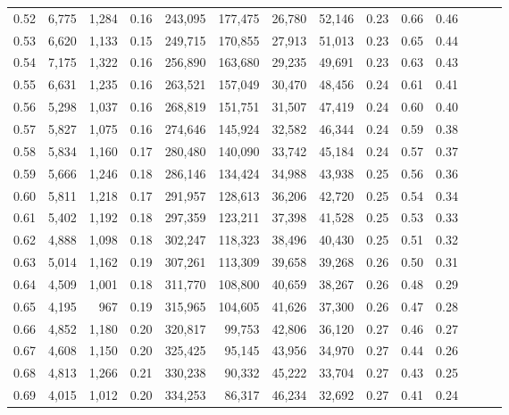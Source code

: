 \begin{tabular}{rrrrrrrrrrrrrr}
0.52 &   6,775 &  1,284 &  0.16 &  243,095 &  177,475 &  26,780 &  52,146 &  0.23 &  0.66 &      0.46 \\
0.53 &   6,620 &  1,133 &  0.15 &  249,715 &  170,855 &  27,913 &  51,013 &  0.23 &  0.65 &      0.44 \\
0.54 &   7,175 &  1,322 &  0.16 &  256,890 &  163,680 &  29,235 &  49,691 &  0.23 &  0.63 &      0.43 \\
0.55 &   6,631 &  1,235 &  0.16 &  263,521 &  157,049 &  30,470 &  48,456 &  0.24 &  0.61 &      0.41 \\
0.56 &   5,298 &  1,037 &  0.16 &  268,819 &  151,751 &  31,507 &  47,419 &  0.24 &  0.60 &      0.40 \\
0.57 &   5,827 &  1,075 &  0.16 &  274,646 &  145,924 &  32,582 &  46,344 &  0.24 &  0.59 &      0.38 \\
0.58 &   5,834 &  1,160 &  0.17 &  280,480 &  140,090 &  33,742 &  45,184 &  0.24 &  0.57 &      0.37 \\
0.59 &   5,666 &  1,246 &  0.18 &  286,146 &  134,424 &  34,988 &  43,938 &  0.25 &  0.56 &      0.36 \\
0.60 &   5,811 &  1,218 &  0.17 &  291,957 &  128,613 &  36,206 &  42,720 &  0.25 &  0.54 &      0.34 \\
0.61 &   5,402 &  1,192 &  0.18 &  297,359 &  123,211 &  37,398 &  41,528 &  0.25 &  0.53 &      0.33 \\
0.62 &   4,888 &  1,098 &  0.18 &  302,247 &  118,323 &  38,496 &  40,430 &  0.25 &  0.51 &      0.32 \\
0.63 &   5,014 &  1,162 &  0.19 &  307,261 &  113,309 &  39,658 &  39,268 &  0.26 &  0.50 &      0.31 \\
0.64 &   4,509 &  1,001 &  0.18 &  311,770 &  108,800 &  40,659 &  38,267 &  0.26 &  0.48 &      0.29 \\
0.65 &   4,195 &    967 &  0.19 &  315,965 &  104,605 &  41,626 &  37,300 &  0.26 &  0.47 &      0.28 \\
0.66 &   4,852 &  1,180 &  0.20 &  320,817 &   99,753 &  42,806 &  36,120 &  0.27 &  0.46 &      0.27 \\
0.67 &   4,608 &  1,150 &  0.20 &  325,425 &   95,145 &  43,956 &  34,970 &  0.27 &  0.44 &      0.26 \\
0.68 &   4,813 &  1,266 &  0.21 &  330,238 &   90,332 &  45,222 &  33,704 &  0.27 &  0.43 &      0.25 \\
0.69 &   4,015 &  1,012 &  0.20 &  334,253 &   86,317 &  46,234 &  32,692 &  0.27 &  0.41 &      0.24 \\

\end{tabular}
